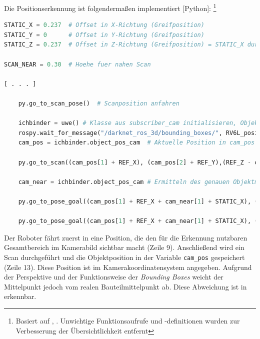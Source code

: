 Die Positionserkennung ist folgendermaßen implementiert [Python]: \footnote[3]{Basiert auf \cite{steinbeck_entwicklung_2022}, . Unwichtige Funktionsaufrufe und -definitionen wurden zur Verbesserung der Übersichtlichkeit entfernt}

\begin{lstlisting}[language=python] 
STATIC_X = 0.237  # Offset in X-Richtung (Greifposition)
STATIC_Y = 0      # Offset in Y-Richtung (Greifposition)
STATIC_Z = 0.237  # Offset in Z-Richtung (Greifposition) = STATIC_X durch Orientierungswechsel
    
SCAN_NEAR = 0.30  # Hoehe fuer nahen Scan
        
[ . . . ]

    py.go_to_scan_pose()  # Scanposition anfahren
    
    ichbinder = uwe() # Klasse aus subscriber_cam initialisieren, Objektpos. auslesen
    rospy.wait_for_message("/darknet_ros_3d/bounding_boxes/", RV6L_positions, timeout=None) # Warten auf Nachricht mit Objektposition relativ zur Kamera
    cam_pos = ichbinder.object_pos_cam  # Aktuelle Position in cam_pos speichern
                         
    py.go_to_scan((cam_pos[1] + REF_X), (cam_pos[2] + REF_Y),(REF_Z - cam_pos[3] + SCAN_NEAR))  # Anfahren der Scanposition ~ ueber dem Bauteil
    
    cam_near = ichbinder.object_pos_cam # Ermitteln des genauen Objektmittelpunktes
        
    py.go_to_pose_goal((cam_pos[1] + REF_X + cam_near[1] + STATIC_X), (cam_pos[2] + REF_Y + cam_near[2] + STATIC_Y), (REF_Z - cam_pos[3] + STATIC_Z - (cam_near[3] - SCAN_NEAR) + 0.25)) # Greifposition anfahren
    
    py.go_to_pose_goal((cam_pos[1] + REF_X + cam_near[1] + STATIC_X), (cam_pos[2] + REF_Y + cam_near[2] + STATIC_Y), (REF_Z - cam_pos[3] + STATIC_Z - (cam_near[3] - SCAN_NEAR))) # Endeffektor absenken
\end{lstlisting}

Der Roboter fährt zuerst in eine Position, die den für die Erkennung nutzbaren Gesamtbereich im Kamerabild sichtbar macht (Zeile 9). Anschließend wird ein Scan durchgeführt und die Objektposition in der Variable \lstinline{cam_pos} gespeichert (Zeile 13). Diese Position ist im Kamerakoordinatensystem  angegeben. Aufgrund der Perspektive und der Funktionsweise der \textit{Bounding Boxes} weicht der Mittelpunkt jedoch vom realen Bauteilmittelpunkt ab. Diese Abweichung ist in  erkennbar.

